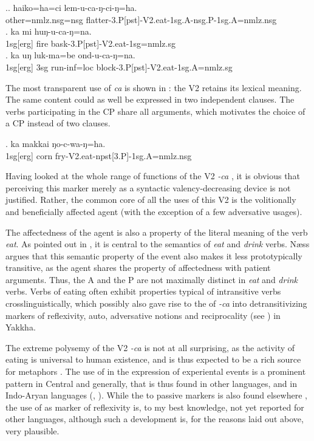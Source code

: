 \ex.\ag. haiko=ha=ci lem-u-ca-ŋ-ci-ŋ=ha.\\
other{\sc =nmlz.nsg=nsg} flatter{\sc -3.P[pst]-V2.eat-1sg.A-nsg.P-1sg.A=nmlz.nsg}\\
\bg. ka mi huŋ-u-ca-ŋ=na.\\
{\sc 1sg[erg]} fire bask{\sc -3.P[pst]-V2.eat-1sg=nmlz.sg}\\
\bg. ka uŋ luk-ma=be ond-u-ca-ŋ=na.\\
{\sc 1sg[erg]} {\sc 3sg} run{\sc -inf=loc} block{\sc -3.P[pst]-V2.eat-1sg.A=nmlz.sg}\\

The most transparent use of \emph{ca} is shown in \Next: the V2 retains its lexical meaning. The same content could as well be expressed in two independent clauses. The verbs participating in the CP share all arguments, which motivates the choice of a CP instead of two clauses. 

\exg. ka makkai ŋo-c-wa-ŋ=ha.\\
{\sc 1sg[erg]} corn fry{\sc -V2.eat-npst[3.P]-1sg.A=nmlz.nsg}\\


Having looked at the whole range of functions of the V2 \emph{-ca} , it is obvious that perceiving this marker merely as a syntactic valency-decreasing device is not justified. Rather, the common core of all the uses of this V2  is the volitionally and beneficially affected agent (with the exception of a few adversative usages). 

The affectedness of the agent is also a property of the literal meaning of the verb \emph{eat}. As pointed out in  \citet[37]{Naess2009_How}, it is central to the semantics of \emph{eat} and \emph{drink} verbs. Næss argues that this semantic property of the event also makes it less prototypically transitive, as the agent shares the property of affectedness with patient arguments. Thus, the A and the P are not maximally distinct in \emph{eat} and \emph{drink} verbs. Verbs of eating often exhibit properties typical of intransitive verbs crosslinguistically, which possibly also gave rise to the  of \emph{-ca} into detransitivizing markers of reflexivity, auto, adversative notions  and reciprocality (see ) in Yakkha. 

The extreme polysemy of the V2 \emph{-ca} is not at all surprising, as the activity of eating is universal to human existence, and is thus expected to be a rich source for metaphors \citep{Newman2009_A-cross-linguistic}. The use of  in the expression of experiental events is a prominent pattern in Central and  generally, that is thus found in other  languages, and in Indo-Aryan languages (\citealt[154]{Hooketal2009_The-semantic}, \citealt{Pramodini2010_Eat}). While the  to passive markers is also found elsewhere \citep[122]{Heineetal2002_World}, the use of  as marker of reflexivity is, to my best knowledge, not yet reported for other languages, although such a development is, for the reasons laid out above, very plausible.



